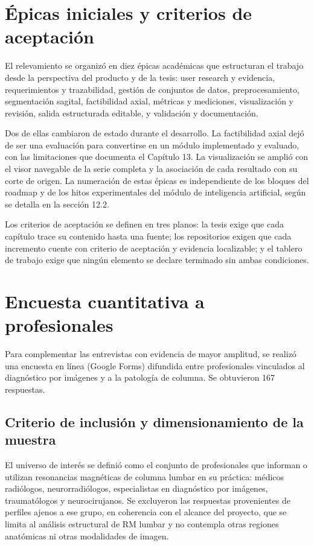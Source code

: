\section{Épicas iniciales y criterios de aceptación}

El relevamiento se organizó en diez épicas académicas que estructuran el trabajo desde la perspectiva del producto y de la tesis: user research y evidencia, requerimientos y trazabilidad, gestión de conjuntos de datos, preprocesamiento, segmentación sagital, factibilidad axial, métricas y mediciones, visualización y revisión, salida estructurada editable, y validación y documentación.

Dos de ellas cambiaron de estado durante el desarrollo. La factibilidad axial dejó de ser una evaluación para convertirse en un módulo implementado y evaluado, con las limitaciones que documenta el Capítulo 13. La visualización se amplió con el visor navegable de la serie completa y la asociación de cada resultado con su corte de origen. La numeración de estas épicas es independiente de los bloques del roadmap y de los hitos experimentales del módulo de inteligencia artificial, según se detalla en la sección 12.2.

Los criterios de aceptación se definen en tres planos: la tesis exige que cada capítulo trace su contenido hasta una fuente; los repositorios exigen que cada incremento cuente con criterio de aceptación y evidencia localizable; y el tablero de trabajo exige que ningún elemento se declare terminado sin ambas condiciones.

\section{Encuesta cuantitativa a profesionales}

Para complementar las entrevistas con evidencia de mayor amplitud, se realizó una encuesta en línea (Google Forms) difundida entre profesionales vinculados al diagnóstico por imágenes y a la patología de columna. Se obtuvieron 167 respuestas.

\subsection{Criterio de inclusión y dimensionamiento de la muestra}

El universo de interés se definió como el conjunto de profesionales que informan o utilizan resonancias magnéticas de columna lumbar en su práctica: médicos radiólogos, neurorradiólogos, especialistas en diagnóstico por imágenes, traumatólogos y neurocirujanos. Se excluyeron las respuestas provenientes de perfiles ajenos a ese grupo, en coherencia con el alcance del proyecto, que se limita al análisis estructural de RM lumbar y no contempla otras regiones anatómicas ni otras modalidades de imagen.

